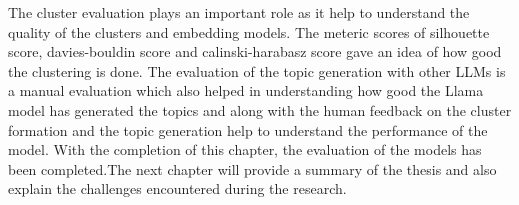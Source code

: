 The cluster evaluation plays an important role as it help to understand the quality of the clusters and embedding models.
The meteric scores of silhouette score, davies-bouldin score and calinski-harabasz score gave an idea of how good the clustering is done.
 The evaluation of the topic generation with other LLMs is a manual evaluation which also helped in understanding how good the Llama model 
 has generated the topics and along with the human feedback on the cluster formation and the topic generation help to understand the performance
 of the model. With the completion of this chapter, the evaluation of the models has been completed.The next chapter will provide a summary of the 
thesis and also explain the challenges encountered during the research.
